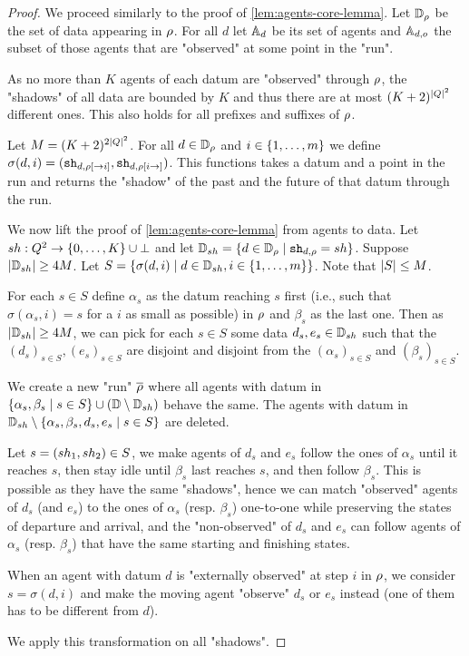 \begin{proof}
	We proceed similarly to the proof of \cref{lem:agents-core-lemma}. 
	Let $\mathbb{D}_\rho$ be the set of data appearing in $\rho$.
	For all $d$ let $\mathbb{A}_d$ be its set of agents and $\mathbb{A}_{d,o}$ the subset of those agents that are "observed" at some point in the "run".
	
	As no more than $K$ agents of each datum are "observed" through $\rho$, the "shadows" of all data are bounded by $K$ and thus there are at most $(K+2)^{|Q|^2}$ different ones. This also holds for all prefixes and suffixes of $\rho$.
	
	Let $M=(K+2)^{2|Q|^2}$. 
	For all $d \in \mathbb{D}_\rho$ and $i \in \{1,\dots,m\}$ we define $\sigma(d,i) = (\mathtt{sh}_{d,\rho[\to i]}, \mathtt{sh}_{d,\rho[i \to]})$. This functions takes a datum and a point in the run and returns the "shadow" of the past and the future of that datum through the run. 
	
	We now lift the proof of \cref{lem:agents-core-lemma} from agents to data.
	Let $sh : Q^2 \to \{0,\dots,K\}\cup \bot$ and let $\mathbb{D}_{sh} = \{d \in \mathbb{D}_{\rho} \mid \mathtt{sh}_{d,\rho} = sh\}$. 
	Suppose $|\mathbb{D}_{sh}| \geq 4M$. 
	Let $S = \{\sigma(d,i) \mid d \in \mathbb{D}_{sh}, i\in\{1,\dots,m\}\}$. Note that $|S|\leq M$.
	
	For each $s \in S$ define $\alpha_s$ as the datum reaching $s$ first (i.e., such that $\sigma(\alpha_s,i) = s$ for a $i$ as small as possible) in $\rho$ and $\beta_s$ as the last one.
	Then as $|\mathbb{D}_{sh}|\geq 4M$, we can pick for each $s \in S$ some data $d_s, e_s \in \mathbb{D}_{sh}$ such that the $(d_s)_{s\in S}, (e_s)_{s\in S}$ are disjoint and disjoint from the $(\alpha_s)_{s\in S}$ and $(\beta_s)_{s\in S}$.
	
	We create a new "run" $\overline{\rho}$ where all agents with datum in $\{\alpha_s, \beta_s \mid s \in S\} \cup (\mathbb{D} \setminus \mathbb{D}_{sh})$ behave the same. 
	The agents with datum in $\mathbb{D}_{sh} \setminus \{\alpha_s, \beta_s, d_s, e_s \mid s \in S\}$ are deleted.
	
	Let $s = (sh_1, sh_2) \in S$, we make agents of $d_s$ and $e_s$ follow the ones of $\alpha_s$ until it reaches $s$, then stay idle until $\beta_s$ last reaches $s$, and then follow $\beta_s$.
	This is possible as they have the same "shadows", hence we can match "observed" agents of $d_s$ (and $e_s$) to the ones of $\alpha_s$ (resp. $\beta_s$) one-to-one while preserving the states of departure and arrival, and the "non-observed" of $d_s$ and $e_s$ can follow agents of $\alpha_s$ (resp. $\beta_s$) that have the same starting and finishing states.
	
	When an agent with datum $d$ is "externally observed" at step $i$ in $\rho$, we consider $s = \sigma(d,i)$ and make the moving agent "observe" $d_s$ or $e_s$ instead (one of them has to be different from $d$).
	
	We apply this transformation on all "shadows".
\end{proof}




